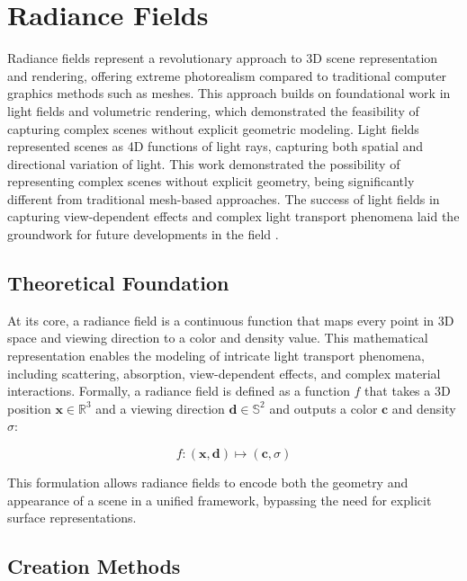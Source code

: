 \section{Radiance Fields}

Radiance fields represent a revolutionary approach to 3D scene representation and rendering, offering extreme photorealism compared to traditional computer graphics methods such as meshes. This approach builds on foundational work in light fields and volumetric rendering, which demonstrated the feasibility of capturing complex scenes without explicit geometric modeling. Light fields \citep{lum1994light} represented scenes as 4D functions of light rays, capturing both spatial and directional variation of light. This work demonstrated the possibility of representing complex scenes without explicit geometry, being significantly different from traditional mesh-based approaches. The success of light fields in capturing view-dependent effects and complex light transport phenomena laid the groundwork for future developments in the field \citep{levoy1996light}.






\subsection{Theoretical Foundation}

At its core, a radiance field is a continuous function that maps every point in 3D space and viewing direction to a color and density value. This mathematical representation enables the modeling of intricate light transport phenomena, including scattering, absorption, view-dependent effects, and complex material interactions. Formally, a radiance field is defined as a function \( f \) that takes a 3D position \( \mathbf{x} \in \mathbb{R}^3 \) and a viewing direction \( \mathbf{d} \in \mathbb{S}^2 \) and outputs a color \( \mathbf{c} \) and density \( \sigma \):

\begin{equation}
f: (\mathbf{x}, \mathbf{d}) \mapsto (\mathbf{c}, \sigma)
\end{equation}

This formulation allows radiance fields to encode both the geometry and appearance of a scene in a unified framework, bypassing the need for explicit surface representations.





\subsection{Creation Methods}

